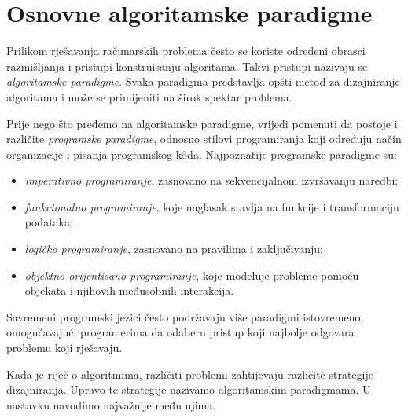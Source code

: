 \chapter{Osnovne algoritamske paradigme}

Prilikom rješavanja računarskih problema često se koriste određeni obrasci razmišljanja i pristupi konstruisanju algoritama. Takvi pristupi nazivaju se \textit{algoritamske paradigme}. Svaka paradigma predstavlja opšti metod za dizajniranje algoritama i može se primijeniti na širok spektar problema.

Prije nego što pređemo na algoritamske paradigme, vrijedi pomenuti da postoje i različite \textit{programske paradigme}, odnosno stilovi programiranja koji određuju način organizacije i pisanja programskog k\^oda. Najpoznatije programske paradigme su:

\begin{itemize}
	\item \textit{imperativno programiranje}, zasnovano na sekvencijalnom izvršavanju naredbi;
	\item \textit{funkcionalno programiranje}, koje naglasak stavlja na funkcije i transformaciju podataka;
	\item \textit{logičko programiranje}, zasnovano na pravilima i zaključivanju;
	\item \textit{objektno orijentisano programiranje}, koje modeluje probleme pomoću objekata i njihovih međusobnih interakcija.
\end{itemize}

Savremeni programski jezici često podržavaju više paradigmi istovremeno, omogućavajući programerima da odaberu pristup koji najbolje odgovara problemu koji rješavaju.

Kada je riječ o algoritmima, različiti problemi zahtijevaju različite strategije dizajniranja. Upravo te strategije nazivamo algoritamskim paradigmama. U nastavku navodimo najvažnije među njima.

